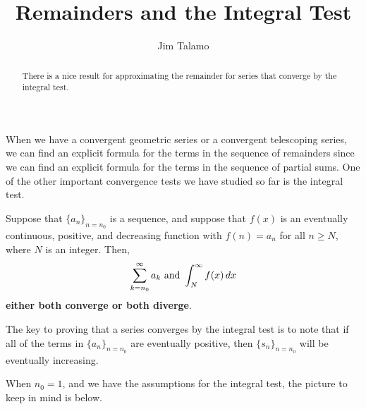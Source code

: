 \documentclass{ximera}
\title[Dig-In:]{Remainders and the Integral Test}
\author{Jim Talamo}
\begin{document}
\begin{abstract}
There is a nice result for approximating the remainder for series that converge by the integral test. 
\end{abstract}
\maketitle

When we have a convergent geometric series or a convergent telescoping series, we can find an explicit formula for the terms in the sequence of remainders since we can find an explicit formula for the terms in the sequence of partial sums.  One of the other important convergence tests we have studied so far is the integral test.

\begin{theorem}
  Suppose that $\{a_n\}_{n=n_0}$ is a sequence, and suppose that $f(x)$ is an eventually continuous, positive, and decreasing function
    with $f(n)=a_n$ for all $n \geq N$, where $N$ is an integer.  Then, 
    \[
    \sum_{k=n_0}^\infty a_k\text{ and }\int_N^\infty f(x) \mathop{}\!d x
    \]
    \textbf{either both converge or both diverge}.
\end{theorem}

The key to proving that a series converges by the integral test is to note that if all of the terms in $\{a_n\}_{n=n_0}$ are eventually positive, then $\{s_n\}_{n=n_0}$ will be eventually increasing.  

When $n_0=1$, and we have the assumptions for the integral test, the picture to keep in mind is below.
\end{document}
